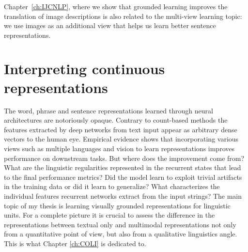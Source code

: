 Chapter~\ref{ch:IJCNLP}, where we show that grounded learning improves the translation
of image descriptions is also related to the multi-view learning topic: we use
images as an additional view that helps us learn better sentence representations.





\section{Interpreting continuous representations}
\label{sec:interpret}
The word, phrase and sentence representations learned through neural architectures are notoriously opaque.
Contrary to count-based methods the features extracted by deep networks from text input
appear as arbitrary dense vectors to the human eye.
Empirical evidence shows that incorporating various views such as multiple languages and vision to
learn representations improves performance on downstream tasks.
But where does the improvement come from? What are the linguistic
regularities represented in the recurrent states that lead to the final performance metrics?
Did the model learn to exploit trivial artifacts in the training data or did it learn to generalize?
What characterizes the individual features recurrent networks extract from the input strings?
The main topic of my thesis is learning visually grounded representations for linguistic units.
For a complete picture it is crucial to assess the difference in the representations
between textual only and multimodal representations not only from a quantitative point of view,
but also from a qualitative linguistics angle.
This is what Chapter \ref{ch:COLI} is dedicated to.

